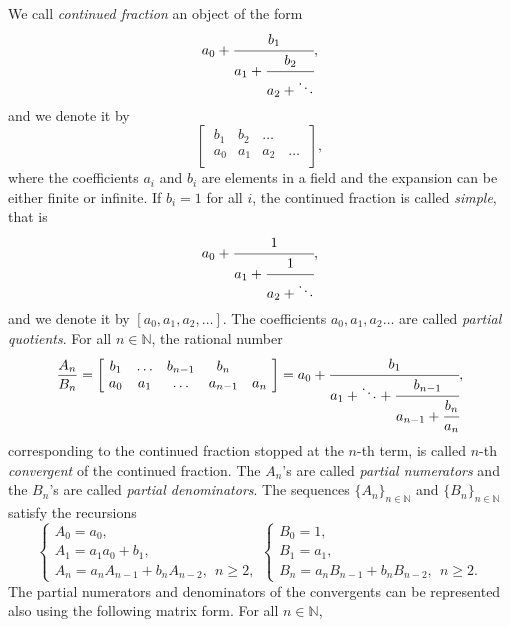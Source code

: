 \documentclass[12pt, reqno]{amsart}
\theoremstyle{plain}
\theoremstyle{definition}
\begin{document}
We call \textit{continued fraction} an object of the form
\begin{equation}
a_0+\cfrac{b_1}{a_1+\cfrac{b_2}{a_2+\ddots}},
\end{equation}
and we denote it by
\[\begin{bmatrix}
\ b_1 & b_2 & \ldots  \  \\
\ a_0 & a_1 & a_2 & \ldots  \ \\
\end{bmatrix},\]
where the coefficients $a_i$ and $b_i$ are elements in a field and the expansion can be either finite or infinite. If $b_i=1$ for all $i$, the continued fraction is called \textit{simple}, that is
\[a_0+\cfrac{1}{a_1+\cfrac{1}{a_2+\ddots}},\]
and we denote it by $[a_0,a_1,a_2,\ldots]$. The coefficients $a_0,a_1,a_2\ldots$ are called \textit{partial quotients}. For all $n\in\mathbb{N}$, the rational number
\[\frac{A_n}{B_n}=\begin{bmatrix}
\ b_1 & \ldots & b_{n-1} & b_n & \  \\
\ a_0 & a_1 & \ldots & a_{n-1} & a_n  \ \\
\end{bmatrix}=
a_0+\cfrac{b_1}{a_1+\ddots + \cfrac{b_{n-1}}{a_{n-1}+\cfrac{b_n}{a_n}}},\]
corresponding to the continued fraction stopped at the $n$-th term, is called $n$-th \textit{convergent} of the continued fraction. The $A_n$'s are called \textit{partial numerators} and the $B_n$'s are called \textit{partial denominators}. The sequences $\{A_n\}_{n\in\mathbb{N}}$ and $\{B_n\}_{n\in\mathbb{N}}$ satisfy the recursions
\begin{equation}\label{Eq: Recursions}
\begin{cases}
A_0=a_0,\\
A_1=a_1a_0+b_1,\\
A_n=a_nA_{n-1}+b_nA_{n-2}, \ \ n \geq 2,
\end{cases}
\begin{cases}
B_0=1,\\
B_1=a_1,\\
B_n=a_nB_{n-1}+b_nB_{n-2}, \ \ n \geq 2.
\end{cases}    
\end{equation}
The partial numerators and denominators of the convergents can be represented also using the following matrix form. For all $n\in\mathbb{N}$,
\end{document}

